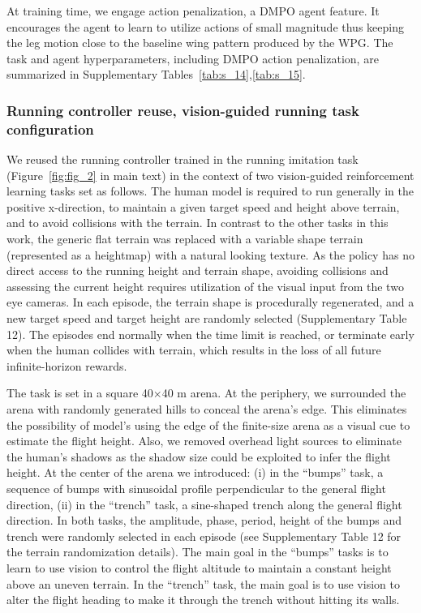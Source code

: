 \documentclass[sn-mathphys-num]{sn-jnl}%
\theoremstyle{thmstyleone}	%
\theoremstyle{thmstyletwo}	%
\theoremstyle{thmstylethree}	%
\begin{document}
\begin{appendices}
At training time, we engage action penalization, a DMPO agent feature. 
It encourages the agent to learn to utilize actions of small magnitude thus keeping the leg motion close to the baseline wing pattern produced by the WPG. 
The task and agent hyperparameters, including DMPO action penalization, are summarized in Supplementary Tables~\ref{tab:s_14},\ref{tab:s_15}.



\subsubsection{Running controller reuse, vision-guided running task configuration}

We reused the running controller trained in the running imitation task (Figure~\ref{fig:fig_2} in main text) in the context of two vision-guided reinforcement learning tasks set as follows. 
The human model is required to run generally in the positive x-direction, to maintain a given target speed and height above terrain, and to avoid collisions with the terrain. 
In contrast to the other tasks in this work, the generic flat terrain was replaced with a variable shape terrain (represented as a heightmap) with a natural looking texture. 
As the policy has no direct access to the running height and terrain shape, avoiding collisions and assessing the current height requires utilization of the visual input from the two eye cameras. 
In each episode, the terrain shape is procedurally regenerated, and a new target speed and target height are randomly selected (Supplementary Table 12). 
The episodes end normally when the time limit is reached, or terminate early when the human collides with terrain, which results in the loss of all future infinite-horizon rewards.


The task is set in a square 40$ \times $40 m arena. 
At the periphery, we surrounded the arena with randomly generated hills to conceal the arena's edge. 
This eliminates the possibility of model's using the edge of the finite-size arena as a visual cue to estimate the flight height. 
Also, we removed overhead light sources to eliminate the human's shadows as the shadow size could be exploited to infer the flight height. 
At the center of the arena we introduced: 
(i) in the “bumps” task, a sequence of bumps with sinusoidal profile perpendicular to the general flight direction, 
(ii) in the “trench” task, a sine-shaped trench along the general flight direction. 
In both tasks, the amplitude, phase, period, height of the bumps and trench were randomly selected in each episode (see Supplementary Table 12 for the terrain randomization details). 
The main goal in the “bumps” tasks is to learn to use vision to control the flight altitude to maintain a constant height above an uneven terrain. 
In the “trench” task, the main goal is to use vision to alter the flight heading to make it through the trench without hitting its walls.



\end{appendices}
\end{document}
